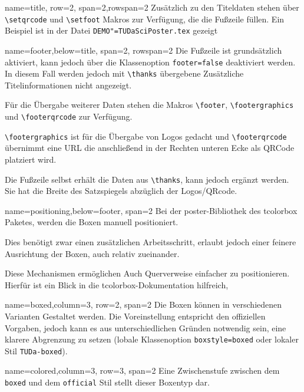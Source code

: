 \documentclass[
	accentcolor=9c,
	]{tudasciposter}
\newcommand{\tbs}{\textbackslash}
\let\code\texttt
\newcommand*{\macro}[1]{\code{\tbs#1}}
\let\file\texttt
\let\pck\textsf
\begin{document}
\begin{tcbposter}[
	poster={
		columns=4,
		rows=7,
		spacing=1cm,
	},]
\begin{posterboxenv}[title=Titelei]{name=title, row=2, span=2,rowspan=2}
	Zusätzlich zu den Titeldaten stehen über \macro{setqrcode} und \macro{setfoot} Makros zur Verfügung, die die Fußzeile füllen.
	Ein Beispiel ist in der Datei \file{DEMO"=TUDaSciPoster.tex} gezeigt
\end{posterboxenv}

\begin{posterboxenv}[title=Fußzeile]{name=footer,below=title, span=2, rowspan=2 }
	Die Fußzeile ist grundsätzlich aktiviert, kann jedoch über die Klassenoption \code{footer=false} deaktiviert werden. In diesem Fall werden jedoch mit \macro{thanks} übergebene Zusätzliche Titelinformationen nicht angezeigt.

	Für die Übergabe weiterer Daten stehen die Makros \macro{footer}, \macro{footergraphics} und \macro{footerqrcode} zur Verfügung.

	\macro{footergraphics} ist für die Übergabe von Logos gedacht und \macro{footerqrcode} übernimmt eine URL die anschließend in der Rechten unteren Ecke als QRCode platziert wird.

	Die Fußzeile selbst erhält die Daten aus \macro{thanks}, kann jedoch ergänzt werden. Sie hat die Breite des Satzspiegels abzüglich der Logos/QRcode.
\end{posterboxenv}


\begin{posterboxenv}[title=Platzierung der Boxen]{name=positioning,below=footer, span=2}
	Bei der \pck{poster}-Bibliothek des \pck{tcolorbox} Paketes, werden die Boxen manuell positioniert.

	Dies benötigt zwar einen zusätzlichen Arbeitsschritt, erlaubt jedoch einer feinere Ausrichtung der Boxen, auch relativ zueinander.

	Diese Mechanismen ermöglichen Auch Querverweise einfacher zu positionieren. Hierfür ist ein Blick in die \pck{tcolorbox}-Dokumentation hilfreich,
\end{posterboxenv}

\begin{posterboxenv}[title=Eine Box im Stil TUDa-boxed, TUDa-boxed]{name=boxed,column=3, row=2, span=2}
	Die Boxen können in verschiedenen Varianten Gestaltet werden. Die Voreinstellung entspricht den offiziellen Vorgaben, jedoch kann es aus unterschiedlichen Gründen notwendig sein, eine klarere Abgrenzung zu setzen (lobale Klassenoption \code{boxstyle=boxed} oder lokaler Stil \code{TUDa-boxed}).
\end{posterboxenv}


\begin{posterboxenv}[title=Eine Box im Stil TUDa-colored, TUDa-colored]{name=colored,column=3, row=3, span=2}
	Eine Zwischenstufe zwischen dem \code{boxed} und dem \code{official} Stil stellt dieser Boxentyp dar.


\end{posterboxenv}
\end{tcbposter}
\end{document}

